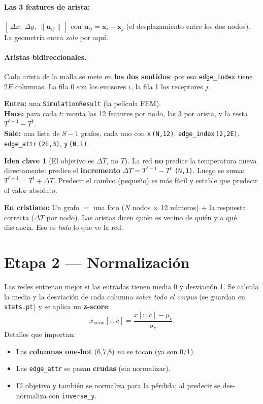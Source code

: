 \documentclass[11pt]{article}
\newcommand{\shp}[1]{{\color{shapecol}\texttt{(#1)}}}   %
\theoremstyle{definition}
\newtheorem{idea}{Idea clave}[section]
\newcommand{\dummies}[1]{%
  \par\smallskip\noindent
  \colorbox{yellow!18}{\parbox{\dimexpr\linewidth-2\fboxsep}{%
  \small\textbf{En cristiano:} #1}}\par\smallskip}
\newcommand{\io}[3]{%
  \par\smallskip\noindent
  \colorbox{blue!6}{\parbox{\dimexpr\linewidth-2\fboxsep}{\small
  \textbf{Entra:} #1 \\ \textbf{Hace:} #2 \\ \textbf{Sale:} #3}}\par\smallskip}
\begin{document}
\paragraph{Las 3 features de arista:} $[\,\Delta x,\ \Delta y,\ \lVert\bm u_{ij}\rVert\,]$
con $\bm u_{ij}=\bm x_i-\bm x_j$ (el desplazamiento entre los dos nodos). La geometría
entra \emph{solo} por aquí.

\paragraph{Aristas bidireccionales.} Cada arista de la malla se mete en
\textbf{los dos sentidos}: por eso \texttt{edge\_index} tiene $2E$ columnas. La fila 0
son los emisores $i$, la fila 1 los receptores $j$.

\io{una \texttt{SimulationResult} (la película FEM).}
{para cada $t$: monta las 12 features por nodo, las 3 por arista, y la resta
$T^{t+1}-T^{t}$.}
{una lista de $S{-}1$ grafos, cada uno con \texttt{x}\,\shp{N,12},
\texttt{edge\_index}\,\shp{2,2E}, \texttt{edge\_attr}\,\shp{2E,3}, \texttt{y}\,\shp{N,1}.}

\begin{idea}[El objetivo es $\Delta T$, no $T$]
La red \textbf{no} predice la temperatura nueva directamente: predice el
\textbf{incremento} $\Delta T=T^{t+1}-T^{t}$ \shp{N,1}. Luego se suma:
$T^{t+1}=T^{t}+\Delta T$. Predecir el cambio (pequeño) es más fácil y estable que
predecir el valor absoluto.
\end{idea}

\dummies{Un grafo $=$ una foto ($N$ nodos $\times$ 12 números) $+$ la respuesta
correcta ($\Delta T$ por nodo). Las aristas dicen quién es vecino de quién y a qué
distancia. Eso es \emph{todo} lo que ve la red.}

\section{Etapa 2 — Normalización}
\label{sec:norm}

Las redes entrenan mejor si las entradas tienen media 0 y desviación 1. Se calcula la
media y la desviación de cada columna \emph{sobre todo el corpus} (se guardan en
\texttt{stats.pt}) y se aplica un \textbf{z-score}:
\[
  x_{\text{norm}}[:,c] = \frac{x[:,c]-\mu_c}{\sigma_c}.
\]
Detalles que importan:
\begin{itemize}[leftmargin=1.4em]
  \item Las \textbf{columnas one-hot} (6,7,8) \emph{no} se tocan (ya son 0/1).
  \item Las \texttt{edge\_attr} se pasan \textbf{crudas} (sin normalizar).
  \item El objetivo \texttt{y} también se normaliza para la pérdida; al predecir se
  des-normaliza con \texttt{inverse\_y}.
\end{itemize}
\end{document}
